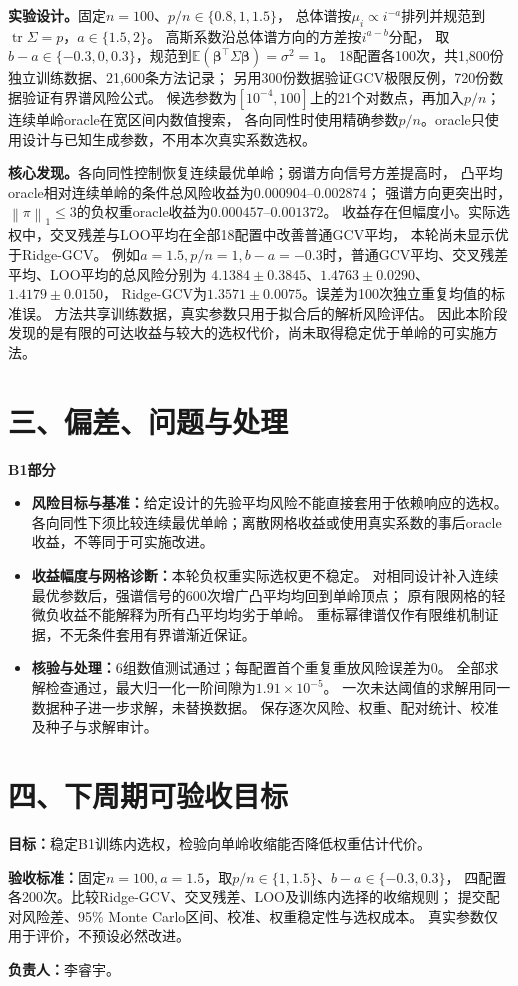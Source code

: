 \documentclass[UTF8,fontset=fandol,11pt,a4paper]{ctexart}
\newcommand{\norm}[1]{\left\lVert#1\right\rVert}
\begin{document}
\textbf{实验设计。}固定$n=100$、$p/n\in\{0.8,1,1.5\}$，
总体谱按$\mu_i\propto i^{-a}$排列并规范到$\operatorname{tr}\Sigma=p$，$a\in\{1.5,2\}$。
高斯系数沿总体谱方向的方差按$i^{a-b}$分配，
取$b-a\in\{-0.3,0,0.3\}$，规范到$\mathbb E(\bm\beta^\top\Sigma\bm\beta)=\sigma^2=1$。
18配置各100次，共1,800份独立训练数据、21,600条方法记录；
另用300份数据验证GCV极限反例，720份数据验证有界谱风险公式。
候选参数为$[10^{-4},100]$上的21个对数点，再加入$p/n$；连续单岭oracle在宽区间内数值搜索，
各向同性时使用精确参数$p/n$。oracle只使用设计与已知生成参数，不用本次真实系数选权。

\textbf{核心发现。}各向同性控制恢复连续最优单岭；弱谱方向信号方差提高时，
凸平均oracle相对连续单岭的条件总风险收益为$0.000904$--$0.002874$；
强谱方向更突出时，$\norm{\pi}_1\le3$的负权重oracle收益为$0.000457$--$0.001372$。
收益存在但幅度小。实际选权中，交叉残差与LOO平均在全部18配置中改善普通GCV平均，
本轮尚未显示优于Ridge-GCV。
例如$a=1.5,p/n=1,b-a=-0.3$时，普通GCV平均、交叉残差平均、LOO平均的总风险分别为
$4.1384\pm0.3845$、$1.4763\pm0.0290$、$1.4179\pm0.0150$，
Ridge-GCV为$1.3571\pm0.0075$。误差为100次独立重复均值的标准误。
方法共享训练数据，真实参数只用于拟合后的解析风险评估。
因此本阶段发现的是有限的可达收益与较大的选权代价，尚未取得稳定优于单岭的可实施方法。

\medskip

\section*{三、偏差、问题与处理}
\textbf{B1部分}
\begin{itemize}
  \item \textbf{风险目标与基准：}给定设计的先验平均风险不能直接套用于依赖响应的选权。
  各向同性下须比较连续最优单岭；离散网格收益或使用真实系数的事后oracle收益，不等同于可实施改进。
  \item \textbf{收益幅度与网格诊断：}本轮负权重实际选权更不稳定。
  对相同设计补入连续最优参数后，强谱信号的600次增广凸平均均回到单岭顶点；
  原有限网格的轻微负收益不能解释为所有凸平均均劣于单岭。
  重标幂律谱仅作有限维机制证据，不无条件套用有界谱渐近保证。
  \item \textbf{核验与处理：}6组数值测试通过；每配置首个重复重放风险误差为0。
  全部求解检查通过，最大归一化一阶间隙为$1.91\times10^{-5}$。
  一次未达阈值的求解用同一数据种子进一步求解，未替换数据。
  保存逐次风险、权重、配对统计、校准及种子与求解审计。
\end{itemize}


\section*{四、下周期可验收目标}
\textbf{目标：}稳定B1训练内选权，检验向单岭收缩能否降低权重估计代价。\par
\textbf{验收标准：}固定$n=100,a=1.5$，取$p/n\in\{1,1.5\}$、$b-a\in\{-0.3,0.3\}$，
四配置各200次。比较Ridge-GCV、交叉残差、LOO及训练内选择的收缩规则；
提交配对风险差、95\% Monte Carlo区间、校准、权重稳定性与选权成本。
真实参数仅用于评价，不预设必然改进。\par
\textbf{负责人：}李睿宇。
\end{document}
